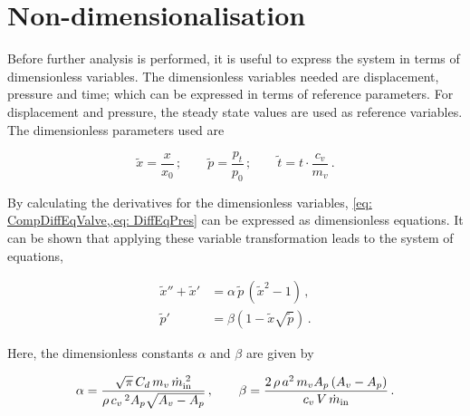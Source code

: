 \section{Non-dimensionalisation}

Before further analysis is performed, it is useful to express the system in terms of dimensionless variables. The dimensionless variables needed are displacement, pressure and time; which can be expressed in terms of reference parameters. For displacement and pressure, the steady state values are used as reference variables. The dimensionless parameters used are

\begin{equation} \label{eq: BadDimensionlessVar}
    \tilde{x} = \frac{x}{x_{0}} \, ; \qquad
    \tilde{p} = \frac{p_t}{p_{0}} \, ; \qquad 
    \tilde{t} = t \cdot \frac{c_v}{m_v} \, .
\end{equation}



By calculating the derivatives for the dimensionless variables, \cref{eq: CompDiffEqValve,,eq: DiffEqPres} can be expressed as dimensionless equations. It can be shown that applying these variable transformation leads to the system of equations,

\begin{equation} \label{eq: Non-DimODE}
\begin{split}
    \tilde{x}'' + \tilde{x}' &= \alpha \, \tilde{p} \, \left( \tilde{x}^2 - 1 \right) \, ,\\
    \tilde{p}' &= \beta \left( 1 - \tilde{x} \sqrt{\tilde{p}} \right) \, .
\end{split}
\end{equation}

Here, the dimensionless constants $\alpha$ and $\beta$ are given by

\begin{equation*}
    \alpha = %
    \frac{\sqrt{\pi} \, C_d \, m_v \, \dot{m}_{\rm{in}}\power{2}}{\rho \, c_v\,^2 A_p \sqrt{A_v - A_p}} \, , %
    \qquad
    \beta = %
    \frac{ 2 \, \rho \, a^2 \, m_v A_p \left( A_v - A_p \right) }{ c_v \, V \, \dot{m}_{\rm{in}} } \, .
\end{equation*}

